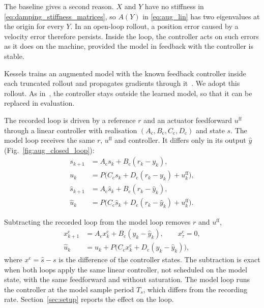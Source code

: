 The baseline gives a second reason.
$X$ and $Y$ have no stiffness in \eqref{eq:damping_stiffness_matrices}, so
$A(Y)$ in \eqref{eq:aug_lin} has two eigenvalues at the origin for every
$Y$.
In an open-loop rollout, a position error caused by a velocity error
therefore persists.
Inside the loop, the controller acts on such errors as it does on the
machine, provided the model in feedback with the controller is stable.

Kessels trains an augmented model with the known feedback controller inside
each truncated rollout and propagates gradients through
it~\cite[Eqs.~(5.12), (5.13c), (5.13d)]{kessels2025ai}.
We adopt this rollout.
As in~\cite[Sec.~5.3.2.3]{kessels2025ai}, the controller stays outside the
learned model, so that it can be replaced in evaluation.

The recorded loop is driven by a reference $r$ and an actuator feedforward
$u^{\mathrm{ff}}$ through a linear controller with realisation
$(A_{\mathrm c},B_{\mathrm c},C_{\mathrm c},D_{\mathrm c})$ and state $s$.
The model loop receives the same $r$, $u^{\mathrm{ff}}$ and controller.
It differs only in its output $\hat y$ (Fig.~\ref{fig:aug_closed_loop}):
\begin{equation}
\begin{aligned}
 s_{k+1}&=A_{\mathrm c} s_k+B_{\mathrm c}(r_k-y_k),\\
 u_k&=P\bigl(C_{\mathrm c} s_k+D_{\mathrm c}(r_k-y_k)+u^{\mathrm{ff}}_k\bigr),\\
 \hat s_{k+1}&=A_{\mathrm c} \hat s_k+B_{\mathrm c}(r_k-\hat y_k),\\
 \hat u_k&=P\bigl(C_{\mathrm c} \hat s_k+D_{\mathrm c}(r_k-\hat y_k)
   +u^{\mathrm{ff}}_k\bigr).
\end{aligned}
\label{eq:aug_direct_controller}
\end{equation}

Subtracting the recorded loop from the model loop removes $r$ and
$u^{\mathrm{ff}}$,
\begin{equation}
\begin{aligned}
 x^{\mathrm c}_{k+1}&=A_{\mathrm c} x^{\mathrm c}_k
   +B_{\mathrm c}(y_k-\hat y_k),\qquad x^{\mathrm c}_\tau=0,\\
 \hat u_k&=u_k+P\bigl(C_{\mathrm c} x^{\mathrm c}_k
   +D_{\mathrm c}(y_k-\hat y_k)\bigr),
\end{aligned}
\label{eq:aug_controller}
\end{equation}
where $x^{\mathrm c}=\hat s-s$ is the difference of the controller states.
The subtraction is exact when both loops apply the same linear controller,
not scheduled on the model state, with the same feedforward and without
saturation.
The model loop runs the controller at the model sample period $T_s$, which
differs from the recording rate.
Section~\ref{sec:setup} reports the effect on the loop.

